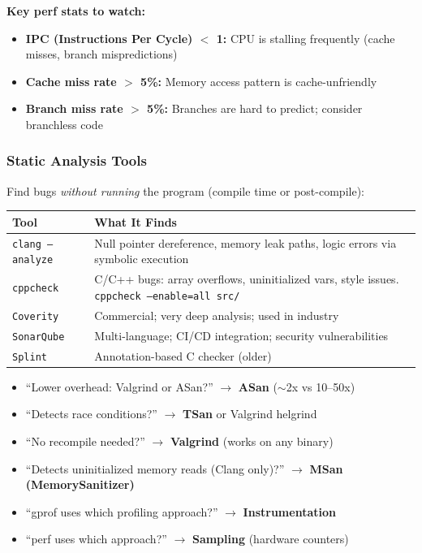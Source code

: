 \documentclass[11pt,a4paper]{article}
\newcommand{\code}[1]{\texttt{\small\colorbox{codebg}{\color{codekw}#1}}}
\newcommand{\highlight}[1]{\colorbox{yellow!50}{\textbf{#1}}}
\begin{document}
\textbf{Key perf stats to watch:}
\begin{itemize}[noitemsep]
  \item \textbf{IPC (Instructions Per Cycle) $<$ 1:} CPU is stalling frequently (cache misses, branch mispredictions)
  \item \textbf{Cache miss rate $>$ 5\%:} Memory access pattern is cache-unfriendly
  \item \textbf{Branch miss rate $>$ 5\%:} Branches are hard to predict; consider branchless code
\end{itemize}

\subsubsection{Static Analysis Tools}

Find bugs \textit{without running} the program (compile time or post-compile):

\begin{center}
\begin{tabular}{L{4cm} L{10cm}}
\toprule
\textbf{Tool} & \textbf{What It Finds} \\
\midrule
\code{clang --analyze} & Null pointer dereference, memory leak paths, logic errors via symbolic execution \\
\code{cppcheck} & C/C++ bugs: array overflows, uninitialized vars, style issues. \code{cppcheck --enable=all src/} \\
\code{Coverity} & Commercial; very deep analysis; used in industry \\
\code{SonarQube} & Multi-language; CI/CD integration; security vulnerabilities \\
\code{Splint} & Annotation-based C checker (older) \\
\bottomrule
\end{tabular}
\end{center}

\begin{mcqtrap}
\begin{itemize}[noitemsep]
  \item ``Lower overhead: Valgrind or ASan?'' $\to$ \highlight{ASan} ($\sim$2x vs 10--50x)
  \item ``Detects race conditions?'' $\to$ \highlight{TSan} or Valgrind helgrind
  \item ``No recompile needed?'' $\to$ \highlight{Valgrind} (works on any binary)
  \item ``Detects uninitialized memory reads (Clang only)?'' $\to$ \highlight{MSan (MemorySanitizer)}
  \item ``gprof uses which profiling approach?'' $\to$ \highlight{Instrumentation}
  \item ``perf uses which approach?'' $\to$ \highlight{Sampling} (hardware counters)
\end{itemize}
\end{mcqtrap}
\end{document}
